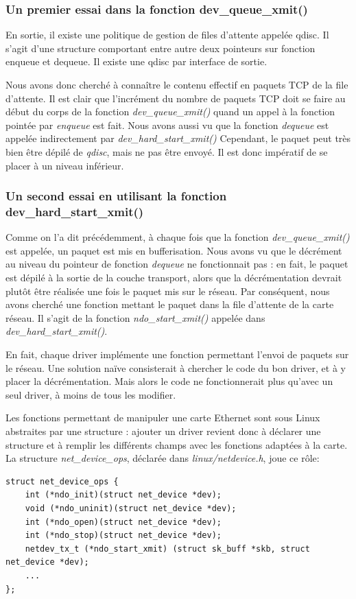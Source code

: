 \documentclass[a4paper]{article}
\begin{document}
\subsubsection{Un premier essai dans la fonction dev\_queue\_xmit()}
En sortie, il existe une politique de gestion de files d'attente appelée qdisc.
Il s'agit d'une structure  comportant entre autre deux pointeurs sur fonction
enqueue et dequeue. Il existe une qdisc par interface de sortie.

Nous avons donc cherché à connaître le contenu effectif en paquets TCP de
la file d'attente. Il est clair que l'incrément du nombre de paquets TCP
doit se faire au début du corps de la fonction \textit{dev\_queue\_xmit()}
quand un appel à la fonction pointée par \textit{enqueue} est fait. Nous
avons aussi vu que la fonction \textit{dequeue} est appelée indirectement
par \textit{dev\_hard\_start\_xmit()} 
Cependant, le paquet peut très bien être dépilé de \textit{qdisc}, mais ne pas
être envoyé. Il est donc impératif de se placer à un niveau inférieur.

\subsubsection{Un second essai en utilisant la fonction dev\_hard\_start\_xmit()}

Comme on l'a dit précédemment, à chaque fois que la fonction \textit{dev\_queue\_xmit()}
est appelée, un paquet est mis en bufferisation. Nous avons vu que le décrément au
niveau du pointeur de fonction \textit{dequeue} ne fonctionnait pas : en fait,
le paquet est dépilé à la sortie de la couche transport, alors que la décrémentation
devrait plutôt être réalisée une fois le paquet mis sur le réseau. Par 
conséquent, nous avons cherché une fonction mettant le paquet dans la file
d'attente de la carte réseau. Il s'agit de la fonction \textit{ndo\_start\_xmit()}
appelée dans \textit{dev\_hard\_start\_xmit()}. 

En fait, chaque driver implémente une fonction permettant l'envoi de
paquets sur le réseau. Une solution naïve consisterait à chercher le
code du bon driver, et à y placer la décrémentation. Mais alors le
code ne fonctionnerait plus qu'avec un seul driver, à moins de tous
les modifier.

Les fonctions permettant de manipuler une carte Ethernet sont sous
Linux abstraites par une structure : ajouter un driver revient donc
à déclarer une structure et à remplir les différents champs avec
les fonctions adaptées à la carte.
La structure \textit{net\_device\_ops}, déclarée dans
\textit{linux/netdevice.h}, joue ce rôle:
\begin{verbatim}
struct net_device_ops {
    int (*ndo_init)(struct net_device *dev);
    void (*ndo_uninit)(struct net_device *dev);
    int (*ndo_open)(struct net_device *dev);
    int (*ndo_stop)(struct net_device *dev);
    netdev_tx_t (*ndo_start_xmit) (struct sk_buff *skb, struct net_device *dev);
    ...
};
\end{verbatim}
\end{document}
